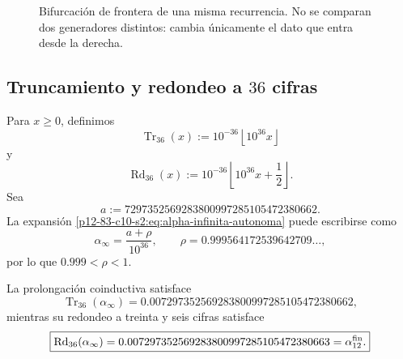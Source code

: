 \begin{figure}[htbp]
\centering
{}
\caption{Bifurcación de frontera de una misma recurrencia. No se comparan
dos generadores distintos: cambia únicamente el dato que entra desde la
derecha.}
\label{p12-83-c10-s2:fig:bifurcacion-frontera-alpha}
\end{figure}

\subsection{Truncamiento y redondeo a \(36\) cifras}

Para \(x\geq0\), definimos
\[
 \operatorname{Tr}_{36}(x)
 :=10^{-36}\left\lfloor10^{36}x\right\rfloor
\]
y
\[
 \operatorname{Rd}_{36}(x)
 :=10^{-36}\left\lfloor10^{36}x+\frac12\right\rfloor.
\]
Sea
\[
 a:=7297352569283800997285105472380662.
\]
La expansión \eqref{p12-83-c10-s2:eq:alpha-infinita-autonoma} puede escribirse como
\[
 \alpha_\infty=\frac{a+\rho}{10^{36}},
 \qquad
 \rho=0.999564172539642709\ldots,
\]
por lo que \(0.999<\rho<1\).

\begin{theorem}
\label{p12-83-c10-s2:thm:frontera-alpha-662-663}
La prolongación coinductiva satisface
\[
 \boxed{
 \operatorname{Tr}_{36}(\alpha_\infty)
 =0.007297352569283800997285105472380662,}
\]
mientras su redondeo a treinta y seis cifras satisface
\[
 \boxed{
 \operatorname{Rd}_{36}(\alpha_\infty)
 =0.007297352569283800997285105472380663
 =\alpha_{12}^{\rm fin}.}
\]
\end{theorem}

